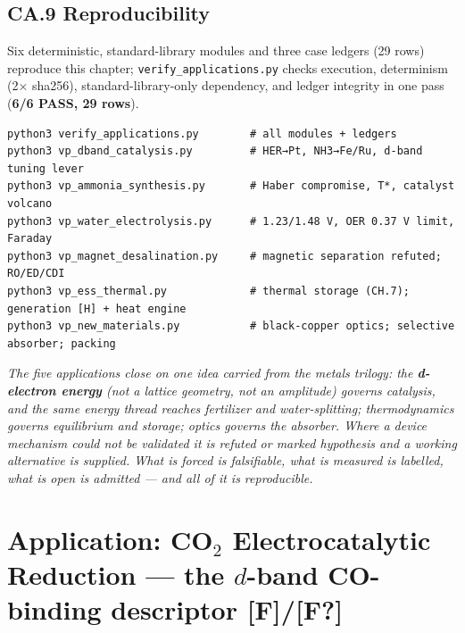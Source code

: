 \documentclass[
  10pt,
]{article}
\begin{document}
\hypertarget{ca.9-reproducibility}{%
\subsection{CA.9 Reproducibility}\label{ca.9-reproducibility}}

Six deterministic, standard-library modules and three case ledgers (29
rows) reproduce this chapter; \texttt{verify\_applications.py} checks
execution, determinism (2× sha256), standard-library-only dependency,
and ledger integrity in one pass (\textbf{6/6 PASS, 29 rows}).

\begin{verbatim}
python3 verify_applications.py        # all modules + ledgers
python3 vp_dband_catalysis.py         # HER→Pt, NH3→Fe/Ru, d-band tuning lever
python3 vp_ammonia_synthesis.py       # Haber compromise, T*, catalyst volcano
python3 vp_water_electrolysis.py      # 1.23/1.48 V, OER 0.37 V limit, Faraday
python3 vp_magnet_desalination.py     # magnetic separation refuted; RO/ED/CDI
python3 vp_ess_thermal.py             # thermal storage (CH.7); generation [H] + heat engine
python3 vp_new_materials.py           # black-copper optics; selective absorber; packing
\end{verbatim}

\emph{The five applications close on one idea carried from the metals
trilogy: the \textbf{d-electron energy} (not a lattice geometry, not an
amplitude) governs catalysis, and the same energy thread reaches
fertilizer and water-splitting; thermodynamics governs equilibrium and
storage; optics governs the absorber. Where a device mechanism could not
be validated it is refuted or marked hypothesis and a working
alternative is supplied. What is forced is falsifiable, what is measured
is labelled, what is open is admitted --- and all of it is
reproducible.}

\newpage

\hypertarget{application-co_2-electrocatalytic-reduction-the-d-band-co-binding-descriptor-ff}{%
\section{\texorpdfstring{Application: CO\(_2\) Electrocatalytic
Reduction --- the \(d\)-band CO-binding descriptor
\textbf{{[}F{]}/{[}F?{]}}}{Application: CO\_2 Electrocatalytic Reduction --- the d-band CO-binding descriptor {[}F{]}/{[}F?{]}}}\label{application-co_2-electrocatalytic-reduction-the-d-band-co-binding-descriptor-ff}}
\end{document}
